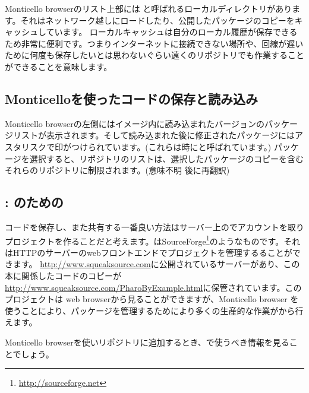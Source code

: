 \documentclass[a4paper,10pt,twoside]{book}
\begin{document}
Monticello browserのリスト上部には と呼ばれるローカルディレクトリがあります。それはネットワーク越しにロードしたり、公開したパッケージのコピーをキャッシュしています。
ローカルキャッシュは自分のローカル履歴が保存できるため非常に便利です。つまりインターネットに接続できない場所や、回線が遅いために何度も保存したいとは思わないぐらい遠くのリポジトリでも作業することができることを意味します。


\subsection{Monticelloを使ったコードの保存と読み込み}
Monticello browserの左側にはイメージ内に読み込まれたバージョンのパッケージリストが表示されます。そして読み込まれた後に修正されたパッケージにはアスタリスクで印がつけられています。(これらは時にと呼ばれています。) パッケージを選択すると、リポジトリのリストは、選択したパッケージのコピーを含むそれらのリポジトリに制限されます。(意味不明 後に再翻訳)



\subsection{\ind{\sqsrc}: \pharo のための} 
コードを保存し、また共有する一番良い方法は\sqsrc サーバー上のでアカウントを取りプロジェクトを作ることだと考えます。\sqsrc はSourceForge\footnote{\url{http://sourceforge.net}}のようなものです。それはHTTPのサーバーのwebフロントエンドでプロジェクトを管理するることができます。
\url{http://www.squeaksource.com}に公開されている\sqsrc サーバーがあり、この本に関係したコードのコピーが\url{http://www.squeaksource.com/PharoByExample.html}に保管されています。このプロジェクトは web browserから見ることができますが、Monticello browser を使うことにより、パッケージを管理するためにより多くの生産的な作業が\pharo から行えます。

Monticello browserを使いリポジトリに追加するとき、\sqsrc で使うべき情報を見ることでしょう。
\end{document}
